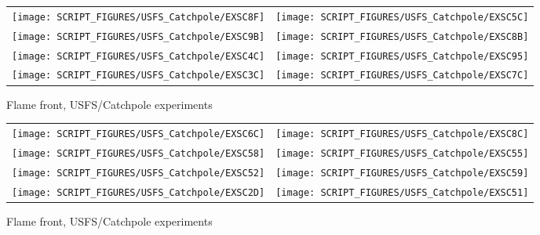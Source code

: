 \begin{figure}[p]
\begin{tabular*}{\textwidth}{l@{\extracolsep{\fill}}r}
\texttt{[image: SCRIPT\_FIGURES/USFS\_Catchpole/EXSC8F]} &
\texttt{[image: SCRIPT\_FIGURES/USFS\_Catchpole/EXSC5C]} \\
\texttt{[image: SCRIPT\_FIGURES/USFS\_Catchpole/EXSC9B]} &
\texttt{[image: SCRIPT\_FIGURES/USFS\_Catchpole/EXSC8B]} \\
\texttt{[image: SCRIPT\_FIGURES/USFS\_Catchpole/EXSC4C]} &
\texttt{[image: SCRIPT\_FIGURES/USFS\_Catchpole/EXSC95]} \\
\texttt{[image: SCRIPT\_FIGURES/USFS\_Catchpole/EXSC3C]} &
\texttt{[image: SCRIPT\_FIGURES/USFS\_Catchpole/EXSC7C]} \\
\end{tabular*}
\caption[Flame front, USFS/Catchpole experiments]{Flame front, USFS/Catchpole experiments}
\label{USFS_Catchpole_072}
\end{figure}

\begin{figure}[p]
\begin{tabular*}{\textwidth}{l@{\extracolsep{\fill}}r}
\texttt{[image: SCRIPT\_FIGURES/USFS\_Catchpole/EXSC6C]} &
\texttt{[image: SCRIPT\_FIGURES/USFS\_Catchpole/EXSC8C]} \\
\texttt{[image: SCRIPT\_FIGURES/USFS\_Catchpole/EXSC58]} &
\texttt{[image: SCRIPT\_FIGURES/USFS\_Catchpole/EXSC55]} \\
\texttt{[image: SCRIPT\_FIGURES/USFS\_Catchpole/EXSC52]} &
\texttt{[image: SCRIPT\_FIGURES/USFS\_Catchpole/EXSC59]} \\
\texttt{[image: SCRIPT\_FIGURES/USFS\_Catchpole/EXSC2D]} &
\texttt{[image: SCRIPT\_FIGURES/USFS\_Catchpole/EXSC51]} \\
\end{tabular*}
\caption[Flame front, USFS/Catchpole experiments]{Flame front, USFS/Catchpole experiments}
\label{USFS_Catchpole_080}
\end{figure}

